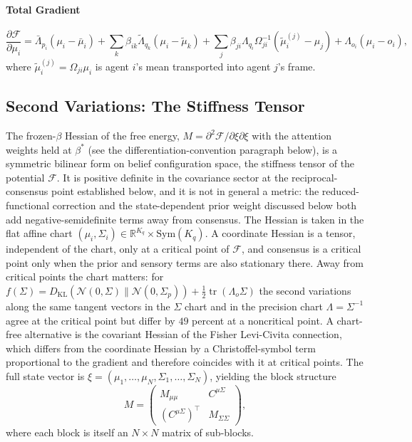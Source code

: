 \documentclass[11pt]{article}
\begin{document}
\paragraph{Total Gradient}
\begin{equation}
\frac{\partial \mathcal{F}}{\partial \mu_i} = \bar{\Lambda}_{p_i}(\mu_i - \bar{\mu}_i) + \sum_k \beta_{ik}\tilde{\Lambda}_{q_k}(\mu_i - \tilde{\mu}_k) + \sum_j \beta_{ji}\Lambda_{q_i}\Omega_{ji}^{-1}(\tilde{\mu}_i^{(j)} - \mu_j) + \Lambda_{o_i}(\mu_i - o_i),
\label{eq:total_gradient_mu}
\end{equation}
where $\tilde{\mu}_i^{(j)} = \Omega_{ji}\mu_i$ is agent $i$'s mean transported into agent $j$'s frame.

\subsection{Second Variations: The Stiffness Tensor}

The frozen-$\beta$ Hessian of the free energy, $M = \partial^2 \mathcal{F}/\partial\xi\partial\xi$ with the attention weights held at $\beta^*$ (see the differentiation-convention paragraph below), is a symmetric bilinear form on belief configuration space, the stiffness tensor of the potential $\mathcal{F}$. It is positive definite in the covariance sector at the reciprocal-consensus point established below, and it is not in general a metric: the reduced-functional correction and the state-dependent prior weight discussed below both add negative-semidefinite terms away from consensus. The Hessian is taken in the flat affine chart $(\mu_i, \Sigma_i) \in \mathbb{R}^{K_q} \times \mathrm{Sym}(K_q)$. A coordinate Hessian is a tensor, independent of the chart, only at a critical point of $\mathcal{F}$, and consensus is a critical point only when the prior and sensory terms are also stationary there. Away from critical points the chart matters: for $f(\Sigma) = D_{\mathrm{KL}}(\mathcal{N}(0,\Sigma)\|\mathcal{N}(0,\Sigma_p)) + \tfrac12\operatorname{tr}(\Lambda_o\Sigma)$ the second variations along the same tangent vectors in the $\Sigma$ chart and in the precision chart $\Lambda = \Sigma^{-1}$ agree at the critical point but differ by $49$ percent at a noncritical point. A chart-free alternative is the covariant Hessian of the Fisher Levi-Civita connection, which differs from the coordinate Hessian by a Christoffel-symbol term proportional to the gradient and therefore coincides with it at critical points. The full state vector is $\xi = (\mu_1, \ldots, \mu_N, \Sigma_1, \ldots, \Sigma_N)$, yielding the block structure
\begin{equation}
M = \begin{pmatrix} M_{\mu\mu} & C^{\mu\Sigma} \\ (C^{\mu\Sigma})^\top & M_{\Sigma\Sigma} \end{pmatrix},
\label{eq:mass_block_structure}
\end{equation}
where each block is itself an $N \times N$ matrix of sub-blocks.
\end{document}
